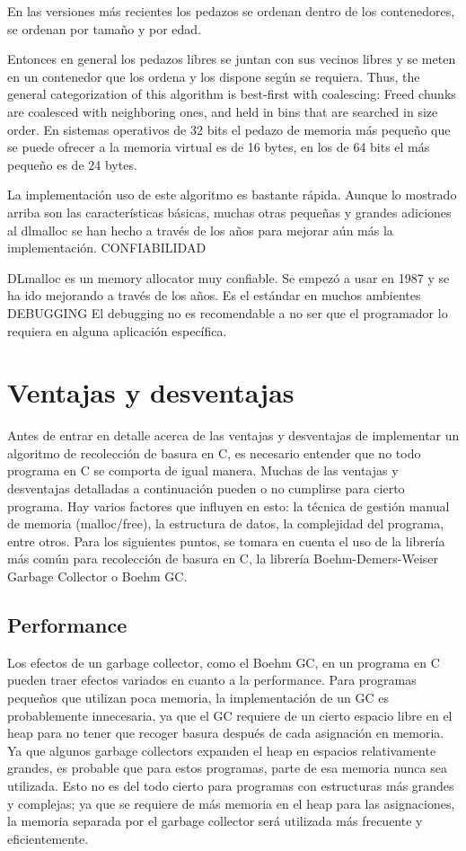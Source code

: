 \documentclass[11pt]{article} %
\begin{document}
En las versiones más recientes los pedazos se ordenan dentro de los contenedores, se ordenan por tamaño y por edad.

Entonces en general los pedazos libres se juntan con sus vecinos libres y se meten en un contenedor que los ordena y los dispone según se requiera.
Thus, the general categorization of this algorithm is best-first with coalescing: Freed chunks are coalesced with neighboring ones, and held in bins that are searched in size order.
En sistemas operativos de 32 bits el pedazo de memoria más pequeño que se puede ofrecer a la memoria virtual es de 16 bytes, en los de 64 bits el más pequeño es de 24 bytes.

La implementación  uso de este algoritmo es bastante rápida. Aunque lo mostrado arriba son las características básicas, muchas otras pequeñas y grandes adiciones al dlmalloc se han hecho a través de los años para mejorar aún más la implementación.
CONFIABILIDAD

DLmalloc es un memory allocator muy confiable. Se empezó a usar en 1987 y se ha ido mejorando a través de los años. Es el estándar en muchos ambientes
DEBUGGING
El debugging no es recomendable a no ser que el programador lo requiera en alguna aplicación específica.

\section{Ventajas y desventajas}
	Antes de entrar en detalle acerca de las ventajas y desventajas de implementar un algoritmo de recolección de basura en C, es necesario entender que no todo programa en C se comporta de igual manera. Muchas de las ventajas y desventajas detalladas a continuación pueden o no cumplirse para cierto programa. Hay varios factores que influyen en esto: la técnica de gestión manual de memoria (malloc/free), la estructura de datos, la complejidad del programa, entre otros.
	Para los siguientes puntos, se tomara en cuenta el uso de la librería más común para recolección de basura en C, la librería Boehm-Demers-Weiser Garbage Collector o Boehm GC.
\subsection{Performance}
	Los efectos de un garbage collector, como el Boehm GC, en un programa en C pueden traer efectos variados en cuanto a la performance. Para programas pequeños que utilizan poca memoria, la implementación de un GC es probablemente innecesaria, ya que el GC requiere de un cierto espacio libre en el heap para no tener que recoger basura después de cada asignación en memoria. Ya que algunos garbage collectors expanden el heap en espacios relativamente grandes, es probable que para estos programas, parte de esa memoria nunca sea utilizada. Esto no es del todo cierto para programas con estructuras más grandes y complejas; ya que se requiere de más memoria en el heap para las asignaciones, la memoria separada por el garbage collector será utilizada más frecuente y eficientemente.
\end{document}
